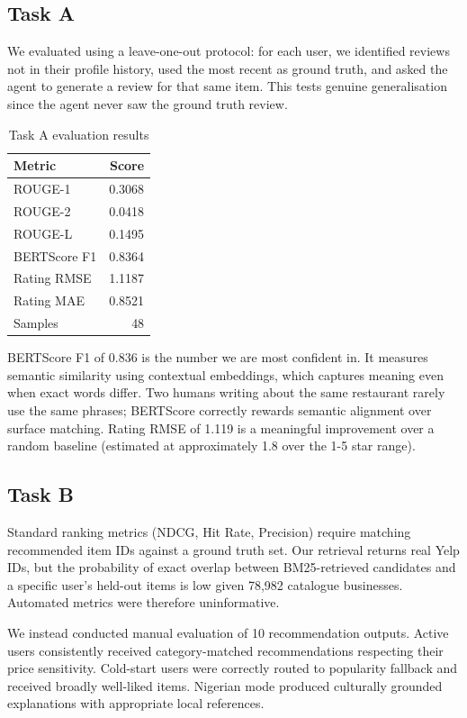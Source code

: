 \documentclass[11pt,a4paper]{article}
\begin{document}
\subsection{Task A}

We evaluated using a leave-one-out protocol: for each user, we identified
reviews not in their profile history, used the most recent as ground truth,
and asked the agent to generate a review for that same item. This tests
genuine generalisation since the agent never saw the ground truth review.

\begin{table}[h]
\centering
\begin{tabular}{lr}
\toprule
\textbf{Metric} & \textbf{Score} \\
\midrule
ROUGE-1         & 0.3068 \\
ROUGE-2         & 0.0418 \\
ROUGE-L         & 0.1495 \\
BERTScore F1    & 0.8364 \\
Rating RMSE     & 1.1187 \\
Rating MAE      & 0.8521 \\
\midrule
Samples         & 48 \\
\bottomrule
\end{tabular}
\caption{Task A evaluation results}
\label{tab:task_a}
\end{table}

BERTScore F1 of 0.836 is the number we are most confident in. It measures
semantic similarity using contextual embeddings, which captures meaning
even when exact words differ. Two humans writing about the same restaurant
rarely use the same phrases; BERTScore correctly rewards semantic alignment
over surface matching. Rating RMSE of 1.119 is a meaningful improvement
over a random baseline (estimated at approximately 1.8 over the 1-5 star
range).

\subsection{Task B}

Standard ranking metrics (NDCG, Hit Rate, Precision) require matching
recommended item IDs against a ground truth set. Our retrieval returns real
Yelp IDs, but the probability of exact overlap between BM25-retrieved
candidates and a specific user's held-out items is low given 78,982
catalogue businesses. Automated metrics were therefore uninformative.

We instead conducted manual evaluation of 10 recommendation outputs. Active
users consistently received category-matched recommendations respecting
their price sensitivity. Cold-start users were correctly routed to
popularity fallback and received broadly well-liked items. Nigerian mode
produced culturally grounded explanations with appropriate local references.
\end{document}
